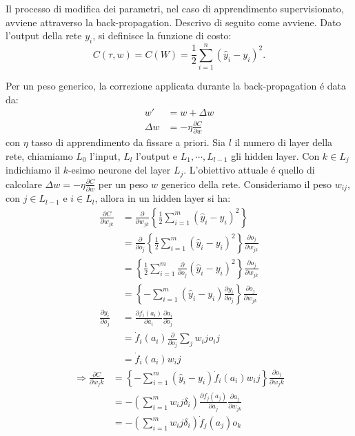 \documentclass[a4paper,10pt]{article}
\begin{document}
 Il processo di modifica dei parametri, nel caso di apprendimento supervisionato, avviene attraverso la back-propagation. Descrivo di seguito come avviene. 
 Dato l'output della rete $y_i$, si definisce la funzione di costo:
 \begin{equation}
  C(\tau,w) = C(W) = \frac{1}{2} \sum_{i=1}^n (\hat{y}_i-y_i)^2.
 \end{equation}
 
 Per un peso generico, la correzione applicata durante la back-propagation \'e data da:
 \begin{align}
  w' &= w + \Delta w \\
  \Delta w &= - \eta \frac{\partial C}{\partial w}
 \end{align}
 con $\eta$ tasso di apprendimento da fissare a priori.
 Sia $l$ il numero di layer della rete, chiamiamo $L_0$ l'input, $L_l$ l'output e $L_1, \cdots, L_{l-1}$ gli hidden layer. Con $k \in L_j$ indichiamo il $k$-esimo neurone del layer $L_j$.
L'obiettivo attuale \'e quello di calcolare $\Delta w = - \eta \frac{\partial C}{\partial w}$ per un peso $w$ generico della rete. Consideriamo il peso $w_{ij}$, con $j \in L_{l-1}$ e $i \in L_l$, allora in un hidden layer si ha:
\begin{align}
 \frac{\partial C}{\partial w_{jk}} &= \frac{\partial}{\partial w_{jk}} \left \{ \frac{1}{2} \sum_{i=1}^m (\hat{y}_i - y_i)^2 \right \} \\
  &= \frac{\partial}{\partial o_j} \left \{ \frac{1}{2} \sum_{i=1}^m (\hat{y}_i - y_i)^2 \right \} \frac{\partial o_j}{\partial w_{jk}} \\
  &= \left \{ \frac{1}{2} \sum_{i=1}^m \frac{\partial}{\partial o_j} (\hat{y}_i - y_i)^2 \right \} \frac{\partial o_j}{\partial w_{jk}} \\
  &= \left \{ - \sum_{i=1}^m (\hat{y}_i - y_i) \frac{\partial y_i}{\partial o_j} \right \} \frac{\partial o_j}{\partial w_{jk}} \\
 \frac{\partial y_i}{\partial o_j} &= \frac{\partial f_i(a_i)}{\partial a_i} \frac{\partial a_i}{\partial o_j} \\
  &= \dot{f}_i(a_i) \frac{\partial}{\partial o_j} \sum_j w_ij o_ij \\
  &= \dot{f}_i(a_i) w_ij 
\end{align}
\begin{align}
 \Rightarrow \frac{\partial C}{\partial w_jk} &= \left \{ - \sum_{i=1}^m (\hat{y}_i - y_i) \dot{f}_i(a_i) w_ij \right \} \frac{\partial o_j}{\partial w_jk} \\
  &= - \left( \sum_{i=1}^m w_ij \delta_i \right) \frac{\partial f_j(a_j)}{\partial a_j} \frac{\partial a_j}{\partial w_{jk}} \\
  &= - \left( \sum_{i=1}^m w_ij \delta_i \right) \dot{f}_j(a_j) o_k \\
\end{align}
\end{document}

